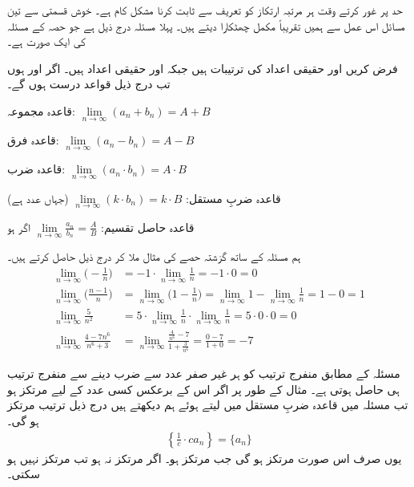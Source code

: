 


حد پر غور کرتے وقت ہر مرتبہ ارتکاز کو تعریف سے ثابت کرنا مشکل کام ہے۔ خوش قسمتی سے تین مسائل اس عمل سے ہمیں تقریباً مکمل چھٹکارا دیتے ہیں۔ پہلا مسئلہ درج ذیل ہے جو حصہ   کے  مسئلہ  کی ایک   صورت ہے۔

فرض کریں  اور  حقیقی اعداد کی ترتیبات ہیں جبکہ  اور  حقیقی اعداد ہیں۔ اگر  اور  ہوں تب  درج ذیل قواعد درست ہوں گے۔
\begin{description}
\item{قاعدہ مجموعہ:}\quad
$\lim\limits_{n\to \infty}(a_n+b_n)=A+B$
\item{قاعدہ فرق:}\quad
$\lim\limits_{n\to\infty}(a_n-b_n)=A-B$
\item{قاعدہ ضرب:}\quad
$\lim\limits_{n\to\infty}(a_n\cdot b_n)=A\cdot B$
\item{قاعدہ ضربِ مستقل:}\quad
$\lim\limits_{n\to\infty}(k\cdot b_n)=k\cdot B$\quad
(جہاں  عدد ہے)
\item{قاعدہ حاصل تقسیم:}\quad
$\lim\limits_{n\to\infty}\frac{a_n}{b_n}=\frac{A}{B}$\quad
اگر     ہو
\end{description}

ہم مسئلہ  کے ساتھ گزشتہ حصے کی مثال  ملا کر درج ذیل حاصل کرتے ہیں۔
\begin{align*}
\lim_{n\to\infty}\big(-\frac{1}{n}\big)&=-1\cdot\lim_{n\to\infty}\frac{1}{n}=-1\cdot0=0\\
\lim_{n\to\infty}\big(\frac{n-1}{n}\big)&=\lim_{n\to\infty}\big(1-\frac{1}{n}\big)=\lim_{n\to\infty} 1-\lim_{n\to\infty}\frac{1}{n}=1-0=1\\
\lim_{n\to\infty}\frac{5}{n^2}&=5\cdot\lim_{n\to\infty}\frac{1}{n}\cdot\lim_{n\to\infty}\frac{1}{n}=5\cdot 0\cdot 0=0\\
\lim_{n\to\infty}\frac{4-7n^6}{n^6+3}&=\lim_{n\to\infty}\frac{\tfrac{4}{n^6}-7}{1+\tfrac{3}{n^6}}=\frac{0-7}{1+0}=-7
\end{align*}

مسئلہ  کے  مطابق  منفرج ترتیب  کو ہر غیر صفر عدد سے ضرب دینے سے منفرج ترتیب ہی حاصل ہوتی ہے۔ مثال کے طور پر اگر اس کے برعکس کسی عدد  کے لیے   مرتکز ہو تب  مسئلہ  میں قاعدہ ضربِ مستقل میں  لیتے ہوئے ہم دیکھتے ہیں درج ذیل ترتیب مرتکز ہو گی۔
\begin{align*}
\left\{\frac{1}{c}\cdot ca_n\right\}=\{a_n\}
\end{align*}
یوں  صرف اس صورت مرتکز ہو گی جب  مرتکز ہو۔ اگر  مرتکز نہ ہو تب  مرتکز نہیں ہو سکتی۔

